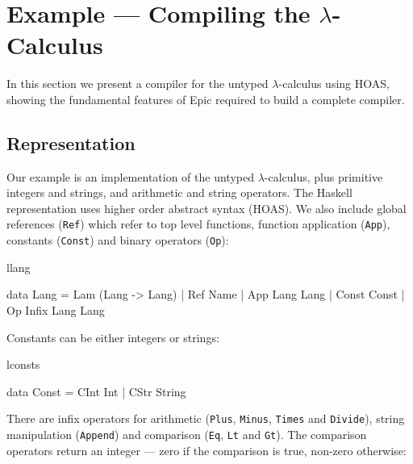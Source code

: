 \section{Example --- Compiling the $\lambda$-Calculus}

\label{sec:lc}

In this section we present a compiler for the untyped $\lambda$-calculus using
HOAS, showing the fundamental features of Epic
required to build a complete compiler.


\subsection{Representation}

Our example is an implementation of the untyped $\lambda$-calculus, plus
primitive integers and strings, and arithmetic and string operators. The
Haskell representation uses higher order abstract syntax (HOAS). We also
include global references (\texttt{Ref}) which refer to top level functions,
function application (\texttt{App}), constants (\texttt{Const}) and binary
operators (\texttt{Op}):

\begin{SaveVerbatim}{llang}

data Lang = Lam (Lang -> Lang)
          | Ref Name
          | App Lang Lang
          | Const Const
          | Op Infix Lang Lang

\end{SaveVerbatim}

\noindent
Constants can be either integers or strings:

\begin{SaveVerbatim}{lconsts}

data Const = CInt Int | CStr String

\end{SaveVerbatim}

\noindent
There are infix operators for arithmetic (\texttt{Plus},
\texttt{Minus}, \texttt{Times} and \texttt{Divide}), string
manipulation (\texttt{Append}) and comparison (\texttt{Eq},
\texttt{Lt} and \texttt{Gt}). The comparison operators return an
integer --- zero if the comparison is true, non-zero otherwise:

